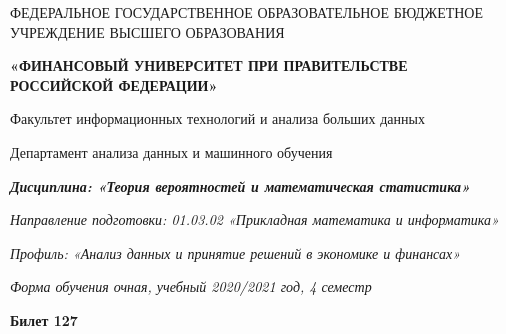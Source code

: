\documentclass[a4paper,14pt]{article}
\begin{document}
\begin{center}
ФЕДЕРАЛЬНОЕ ГОСУДАРСТВЕННОЕ ОБРАЗОВАТЕЛЬНОЕ БЮДЖЕТНОЕ УЧРЕЖДЕНИЕ ВЫСШЕГО ОБРАЗОВАНИЯ

    \textbf{«ФИНАНСОВЫЙ УНИВЕРСИТЕТ ПРИ ПРАВИТЕЛЬСТВЕ РОССИЙСКОЙ ФЕДЕРАЦИИ»}

Факультет информационных технологий и анализа больших данных

Департамент анализа данных и машинного обучения

\textit{
	\textbf{Дисциплина: «Теория вероятностей и математическая статистика»}}

\textit{Направление подготовки: 01.03.02 «Прикладная математика и информатика»}

\textit{Профиль: «Анализ данных и принятие решений в экономике и финансах»}

\textit{Форма обучения очная, учебный 2020/2021 год, 4 семестр}

\textbf{Билет 127}

\end{center}
\end{document}
